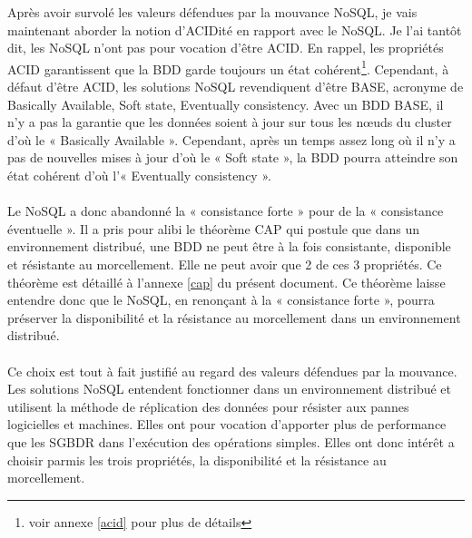Après avoir survolé les valeurs défendues par la
mouvance \textsf{NoSQL}, je vais maintenant aborder la notion
d'\textsf{ACIDité} en rapport avec le \textsf{NoSQL}. Je l'ai tantôt
dit, les \textsf{NoSQL} n'ont pas pour vocation
d'être \textsf{ACID}. En rappel, les propriétés \textsf{ACID}
garantissent que la \textsf{BDD} garde toujours un état
cohérent\footnote{voir annexe \ref{acid} pour plus de
détails}. Cependant, à défaut d'être \textsf{ACID}, les
solutions \textsf{NoSQL} revendiquent
d'être \textsf{BASE}\cite{RickCattell}, acronyme de \textsf{Basically
Available, Soft state, Eventually consistency}. Avec un \textsf{BDD
BASE}, il n'y a pas la garantie que les données soient à jour sur tous
les nœuds du cluster d'où le « \textsf{Basically Available}
». Cependant, après un temps assez long où il n'y a pas de nouvelles
mises à jour d'où le « \textsf{Soft state} », la \textsf{BDD} pourra
atteindre son état cohérent d'où l'« \textsf{Eventually consistency}
».
\\
\\
Le \textsf{NoSQL} a donc abandonné la « consistance forte » pour de la
« consistance éventuelle ». Il a pris pour alibi le
théorème \textsf{CAP}\cite{MichaelStonebraker2} qui postule que dans un environnement distribué,
une \textsf{BDD} ne peut être à la fois consistante, disponible et
résistante au morcellement. Elle ne peut avoir que 2 de ces 3
propriétés. Ce théorème est détaillé à l'annexe \ref{cap} du présent
document. Ce théorème laisse entendre donc
que le \textsf{NoSQL}, en renonçant à la « consistance forte », pourra
préserver la \textsf{disponibilité} et la \textsf{résistance au
morcellement} dans un environnement distribué.
\\
\\
Ce choix est tout à fait justifié au regard des valeurs défendues par
la mouvance. Les solutions \textsf{NoSQL} entendent fonctionner dans
un environnement distribué et utilisent la méthode de réplication des
données pour résister aux pannes logicielles et machines. Elles ont pour
vocation d'apporter plus de performance que les \textsf{SGBDR} dans
l'exécution des opérations simples. Elles ont donc intérêt a choisir
parmis les trois propriétés, la \textsf{disponibilité} et
la \textsf{résistance au morcellement}.
